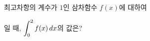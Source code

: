 최고차항의 계수가 $1$인 삼차함수 $f(x)$에 대하여\par\smallskip{}\par\smallskip\noindent 일 때, $\displaystyle\int_{0}^{2}f(x)\mkern3mu dx$의 값은?
